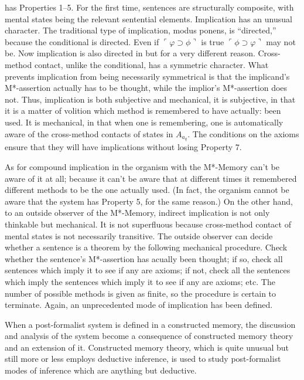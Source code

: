  has Properties 1--5. For the first time, sentences are 
structurally composite, with mental states being the relevant sentential 
elements. Implication has an unusual character. The traditional type of 
implication, modus ponens, is \enquote{directed,} because the conditional is 
directed. Even if $\ulcorner\varphi\supset\phi\urcorner$ is true 
$\ulcorner\phi\supset\varphi\urcorner$ may not be. Now implication is also 
directed in  but for a very different reason. 
Cross-method contact, unlike the conditional, has a symmetric character. 
What prevents implication from being necessarily symmetrical is that the 
implicand's M*-assertion actually has to be thought, while the implior's 
M*-assertion does not. Thus, implication is both subjective and mechanical, 
it is subjective, in that it is a matter of volition which method is remembered 
to have actually: been used. It is mechanical, in that when one is 
remembering, one is automatically aware of the cross-method contacts of 
states in $A_{a_q}$. The conditions on the axioms ensure that they will have 
implications without losing Property 7. 

As for compound implication in  the organism 
with the M*-Memory can't be aware of it at all; because it can't be aware 
that at different times it remembered different methods to be the one 
actually used. (In fact, the organism cannot be aware that the system has 
Property 5, for the same reason.) On the other hand, to an outside observer 
of the M*-Memory, indirect implication is not only thinkable but 
mechanical. It is not superfluous because cross-method contact of mental 
states is not necessarily transitive. The outside observer can decide whether a 
sentence is a theorem by the following mechanical procedure. Check 
whether the sentence's M*-assertion has acually been thought; if so, check all 
sentences which imply it to see if any are axioms; if not, check all the 
sentences which imply the sentences which imply it to see if any are axioms; 
etc. The number of possible methods is given as finite, so the procedure is 
certain to terminate. Again, an unprecedented mode of implication has been 
defined. 

When a post-formalist system is defined in a constructed memory, the 
discussion and analysis of the system become a consequence of constructed 
memory theory and an extension of it. Constructed memory theory, which 
is quite unusual but still more or less employs deductive inference, is used to 
study post-formalist modes of inference which are anything but deductive. 

